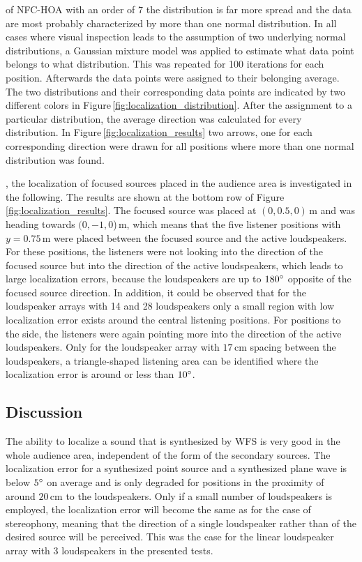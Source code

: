 of \ac{NFC-HOA} with an order of $7$ the distribution is far more spread and the
data are most probably characterized by more than one normal distribution. In all
cases where visual inspection leads to the assumption of two underlying normal
distributions, a Gaussian mixture model was applied to estimate what data point
belongs to what distribution. This was repeated for 100 iterations for each
position. Afterwards the data points were assigned to their belonging average.
The two distributions and their corresponding data points are
indicated by two different colors in
Figure\,\ref{fig:localization_distribution}. After the assignment to a particular
distribution, the average direction was calculated for every distribution. In
Figure\,\ref{fig:localization_results} two arrows, one for each corresponding
direction were drawn for all positions where more than one normal distribution
was found.

, the localization of focused
sources placed in the audience area is investigated in the following.
The results are shown
at the bottom row of Figure\,\ref{fig:localization_results}. The focused source
was placed at $(0,0.5,0)$\,m and was heading towards $(0,-1,0$)\,m, which means that
the five listener positions with $y=0.75$\,m were placed between the focused
source and the active loudspeakers. For these positions, the listeners were not
looking into the direction of the focused source but into the direction of the
active loudspeakers, which leads to large localization errors, because the
loudspeakers are up to $180^\circ$ opposite of the focused source direction.
In addition, it could be observed that for the loudspeaker arrays with 14 and 28
loudspeakers only a small region with low localization error exists around the
central listening positions. For positions to the side, the
listeners were again pointing more into the direction of the active loudspeakers.
Only for the loudspeaker array with $17$\,cm spacing
between the loudspeakers, a triangle-shaped listening area can be identified where the
localization error is around or less than $10^\circ$.


\subsection{Discussion}
\label{sec:localization_discussion}
%
The ability to localize a sound that is synthesized by \ac{WFS} is very good in
the whole audience area, independent of the form of the secondary sources. The
localization error for a synthesized point source and a synthesized plane wave
is below $5^\circ$ on average and is only degraded for positions in the
proximity of around $20$\,cm to the loudspeakers. Only if a small number of loudspeakers
is employed, the localization error will become the same as for the case
of stereophony, meaning that the direction of a single loudspeaker rather than of
the desired source will be perceived. This was the case for the linear
loudspeaker array with 3 loudspeakers in the presented tests.

